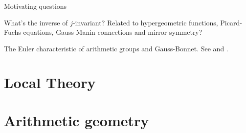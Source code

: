 \documentclass[a4paper, twoside]{article}
\begin{document}
\confighead{}{}{}


\begin{qst}
	Motivating questions
	\begin{itm}
		\item What's the inverse of $j$-invariant? Related to hypergeometric functions, Picard-Fuchs equations, Gauss-Manin connections and mirror symmetry?
		\item The Euler characteristic of arithmetic groups and Gauss-Bonnet. See \cite[Page~255]{Brown1994} and \cite{Harder1971}.
	\end{itm}
\end{qst}


\part{Local Theory}





\part{Arithmetic geometry}















\printref
\end{document}
